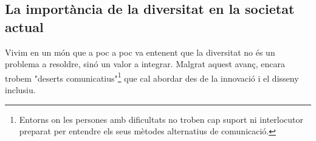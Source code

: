 \subsection{La importància de la diversitat en la societat actual}
Vivim en un món que a poc a poc va entenent que la diversitat no és un problema a resoldre, sinó un valor a integrar. Malgrat aquest avanç, encara trobem "deserts comunicatius"\footnote{Entorns on les persones amb dificultats no troben cap suport ni interlocutor preparat per entendre els seus mètodes alternatius de comunicació.} que cal abordar des de la innovació i el disseny inclusiu.
